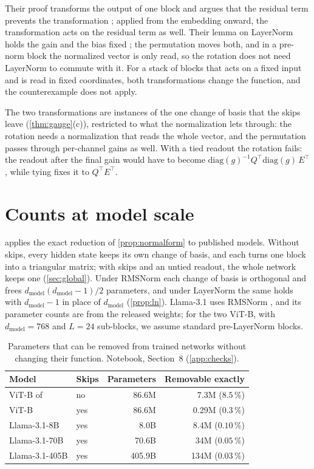 \documentclass[10pt]{article}
\theoremstyle{definition}
\theoremstyle{remark}
\newcommand{\dm}{d_{\mathrm{model}}}
\begin{document}
Their proof transforms the output of one block and argues that the residual term prevents the transformation \citep[Theorem~30]{wang2025gauge}; applied from the embedding onward, the transformation acts on the residual term as well. Their lemma on LayerNorm holds the gain and the bias fixed \citep[Lemma~26]{wang2025gauge}; the permutation moves both, and in a pre-norm block the normalized vector is only read, so the rotation does not need LayerNorm to commute with it. For a stack of blocks that acts on a fixed input and is read in fixed coordinates, both transformations change the function, and the counterexample does not apply.

The two transformations are instances of the one change of basis that the skips leave (\cref{thm:gauge}(c)), restricted to what the normalization lets through: the rotation needs a normalization that reads the whole vector, and the permutation passes through per-channel gains as well. With a tied readout the rotation fails: the readout after the final gain would have to become $\mathrm{diag}(g)^{-1}Q^\top\mathrm{diag}(g)\,E^\top$, while tying fixes it to $Q^\top E^\top$.

\FloatBarrier
\section{Counts at model scale}\label{app:scale}

 applies the exact reduction of \cref{prop:normalform} to published models. Without skips, every hidden state keeps its own change of basis, and each turns one block into a triangular matrix; with skips and an untied readout, the whole network keeps one (\cref{sec:global}). Under RMSNorm each change of basis is orthogonal and frees $\dm(\dm-1)/2$ parameters, and under LayerNorm the same holds with $\dm - 1$ in place of $\dm$ (\cref{prop:ln}). Llama-3.1 uses RMSNorm \citep{grattafiori2024llama3}, and its parameter counts are from the released weights; for the two ViT-B, with $\dm = 768$ and $L = 24$ sub-blocks, we assume standard pre-LayerNorm blocks.

\begin{table}[ht]
\centering\small
\caption{Parameters that can be removed from trained networks without changing their function. Notebook, Section~8 (\cref{app:checks}).}
\label{tab:scale}
\begin{tabular}{llrr}
\toprule
Model & Skips & Parameters & Removable exactly \\
\midrule
ViT-B of \citet{ji2026cutting} & no & 86.6M & 7.3M ($8.5\,\%$) \\
ViT-B & yes & 86.6M & 0.29M ($0.3\,\%$) \\
\midrule
Llama-3.1-8B & yes & 8.0B & 8.4M ($0.10\,\%$) \\
Llama-3.1-70B & yes & 70.6B & 34M ($0.05\,\%$) \\
Llama-3.1-405B & yes & 405.9B & 134M ($0.03\,\%$) \\
\bottomrule
\end{tabular}
\end{table}
\end{document}
